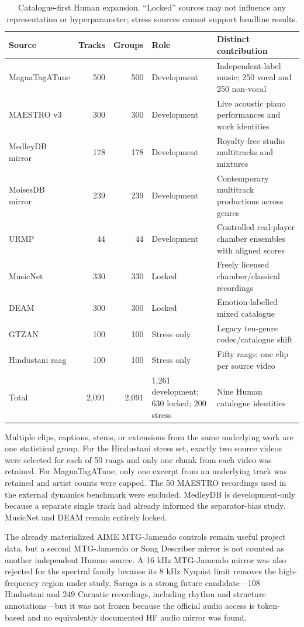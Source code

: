 \begin{table}[H]
\centering
\small
\caption{Catalogue-first Human expansion.  ``Locked'' sources may not influence any
representation or hyperparameter; stress sources cannot support headline results.}
\label{tab:human-catalogue-expansion}
\begin{tabular}{p{35mm}rrp{31mm}p{42mm}}
\toprule
Source & Tracks & Groups & Role & Distinct contribution \\
\midrule
MagnaTagATune & 500 & 500 & Development & Independent-label music; 250 vocal and 250 non-vocal \\
MAESTRO v3 & 300 & 300 & Development & Live acoustic piano performances and work identities \\
MedleyDB mirror & 178 & 178 & Development & Royalty-free studio multitracks and mixtures \\
MoisesDB mirror & 239 & 239 & Development & Contemporary multitrack productions across genres \\
URMP & 44 & 44 & Development & Controlled real-player chamber ensembles with aligned scores \\
MusicNet & 330 & 330 & Locked & Freely licensed chamber/classical recordings \\
DEAM & 300 & 300 & Locked & Emotion-labelled mixed catalogue \\
GTZAN & 100 & 100 & Stress only & Legacy ten-genre codec/catalogue shift \\
Hindustani raag & 100 & 100 & Stress only & Fifty raags; one clip per source video \\
\midrule
Total & 2,091 & 2,091 & 1,261 development; 630 locked; 200 stress & Nine Human catalogue identities \\
\bottomrule
\end{tabular}
\end{table}

Multiple clips, captions, stems, or extensions from the same underlying work are one
statistical group.  For the Hindustani stress set, exactly two source videos were
selected for each of 50 raags and only one chunk from each video was retained.  For
MagnaTagATune, only one excerpt from an underlying track was retained and artist
counts were capped.  The 50 MAESTRO recordings used in the external dynamics
benchmark were excluded.  MedleyDB is development-only because a separate single
track had already informed the separator-bias study.  MusicNet and DEAM remain
entirely locked.

The already materialized AIME MTG-Jamendo controls remain useful project data, but a
second MTG-Jamendo or Song Describer mirror is not counted as another independent
Human source.  A 16 kHz MTG-Jamendo mirror was also rejected for the spectral family
because its 8 kHz Nyquist limit removes the high-frequency region under study.
Saraga is a strong future candidate---108 Hindustani and 249 Carnatic recordings,
including rhythm and structure annotations---but it was not frozen because the
official audio access is token-based and no equivalently documented HF audio mirror
was found.

